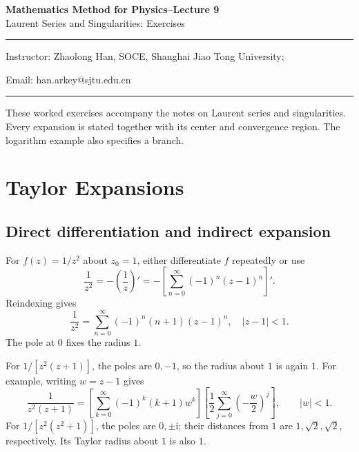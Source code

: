 \documentclass[11pt,a4paper]{article}
\theoremstyle{definition}
\theoremstyle{plain}
\begin{document}
\begin{center}
    {\LARGE \textbf{Mathematics Method for Physics--Lecture 9}} \\[0.6em]
    {\large Laurent Series and Singularities: Exercises}
\end{center}

\vspace{-0.5em}
\noindent\rule{\textwidth}{0.5pt}
\vspace{0.3em}

\begin{center}
    Instructor: Zhaolong Han, SOCE, Shanghai Jiao Tong University;
\end{center}

\vspace{-0.6em}
\noindent Email: han.arkey@sjtu.edu.cn

\vspace{0.4em}
\noindent\rule{\textwidth}{0.5pt}

\vspace{0.8em}

These worked exercises accompany the notes on Laurent series and
singularities. Every expansion is stated together with its center
and convergence region. The logarithm example also specifies a branch.

\section{Taylor Expansions}
\subsection{Direct differentiation and indirect expansion}
For $f(z)=1/z^2$ about $z_0=1$, either differentiate $f$ repeatedly or use
\begin{equation}\label{eq:01}
\frac1{z^2}=-\left(\frac1z\right)'
 =-\left[\sum_{n=0}^{\infty}(-1)^n(z-1)^n\right]'.
\end{equation}
Reindexing gives
\begin{equation}\label{eq:02}
\boxed{\frac1{z^2}
 =\sum_{n=0}^{\infty}(-1)^n(n+1)(z-1)^n,\quad |z-1|<1.}
\end{equation}
The pole at $0$ fixes the radius $1$.

For $1/[z^2(z+1)]$, the poles are $0,-1$, so the radius about $1$ is
again $1$. For example, writing $w=z-1$ gives
\begin{equation}\label{eq:03}
\frac1{z^2(z+1)}
 =\left[\sum_{k=0}^{\infty}(-1)^k(k+1)w^k\right]
  \left[\frac12\sum_{j=0}^{\infty}\left(-\frac w2\right)^j\right],
 \qquad |w|<1.
\end{equation}
For $1/[z^2(z^2+1)]$, the poles are $0,\pm \mathrm{i}$; their distances from
$1$ are $1,\sqrt2,\sqrt2$, respectively. Its Taylor radius about $1$
is also $1$.
\end{document}
